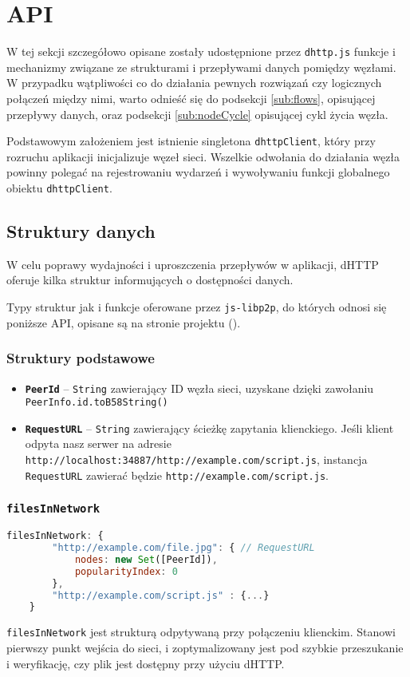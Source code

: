 \section{API}
W tej sekcji szczegółowo opisane zostały udostępnione przez \texttt{dhttp.js} funkcje i mechanizmy związane ze strukturami i przepływami danych pomiędzy węzłami. W przypadku wątpliwości co do działania pewnych rozwiązań czy logicznych połączeń między nimi, warto odnieść się do podsekcji \ref{sub:flows}, opisującej przepływy danych, oraz podsekcji \ref{sub:nodeCycle} opisującej cykl życia węzła.

Podstawowym założeniem jest istnienie singletona \texttt{dhttpClient}, który przy rozruchu aplikacji inicjalizuje węzeł sieci. Wszelkie odwołania do działania węzła powinny polegać na rejestrowaniu wydarzeń i wywoływaniu funkcji globalnego obiektu \texttt{dhttpClient}.

\subsection{Struktury danych}
W celu poprawy wydajności i uproszczenia przepływów w aplikacji, dHTTP oferuje kilka struktur informujących o dostępności danych.

Typy struktur jak i funkcje oferowane przez \texttt{js-libp2p}, do których odnosi się poniższe API, opisane są na stronie projektu (\cite{libp2pReadme}).

\subsubsection{Struktury podstawowe}
\begin{itemize}
    \item \textbf{\texttt{PeerId}} -- \texttt{String} zawierający ID węzła sieci, uzyskane dzięki zawołaniu \texttt{PeerInfo.id.toB58String()}
    \item \textbf{\texttt{RequestURL}} -- \texttt{String} zawierający ścieżkę zapytania klienckiego. Jeśli klient odpyta nasz serwer na adresie \texttt{http://localhost:34887/http://example.com/script.js}, instancja \texttt{RequestURL} zawierać będzie \texttt{http://example.com/script.js}.
\end{itemize}

% 

\subsubsection{\texttt{filesInNetwork}}
\begin{lstlisting}[language=javascript]
filesInNetwork: {
        "http://example.com/file.jpg": { // RequestURL
            nodes: new Set([PeerId]),
            popularityIndex: 0
        },
        "http://example.com/script.js" : {...}
    }
\end{lstlisting}
\texttt{filesInNetwork} jest strukturą odpytywaną przy połączeniu klienckim. Stanowi pierwszy punkt wejścia do sieci, i zoptymalizowany jest pod szybkie przeszukanie i weryfikację, czy plik jest dostępny przy użyciu dHTTP.

